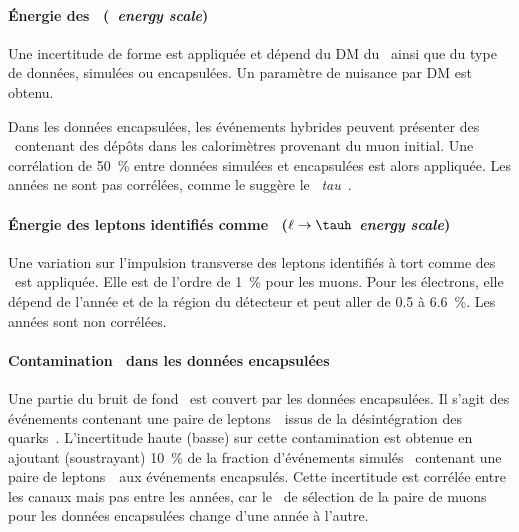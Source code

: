 \paragraph{Énergie des \tauh\ (\emph{\tauh\ energy scale})}
Une incertitude de forme est appliquée et dépend du DM du \tauh\ ainsi que du type de données, simulées ou encapsulées.
Un paramètre de nuisance par DM est obtenu.
\par
Dans les données encapsulées, les événements hybrides peuvent présenter des \tauh\ contenant des dépôts dans les calorimètres provenant du muon initial.
Une corrélation de \SI{50}{\%} entre données simulées et encapsulées est alors appliquée.
Les années ne sont pas corrélées, comme le suggère le \POG\ \emph{tau}~\cite{TauPOG}.
\paragraph{Énergie des leptons identifiés comme \tauh\ (\emph{$\ell\to\tauh$ energy scale})}
Une variation sur l'impulsion transverse des leptons identifiés à tort comme des \tauh\ est appliquée.
Elle est de l'ordre de \SI{1}{\%} pour les muons.
Pour les électrons, elle dépend de l'année et de la région du détecteur et peut aller de \num{0.5} à \SI{6.6}{\%}.
Les années sont non corrélées.
\paragraph{Contamination \ttbar\ dans les données encapsulées}
Une partie du bruit de fond \ttbar\ est couvert par les données encapsulées.
Il s'agit des événements contenant une paire de leptons~\tau\ issus de la désintégration des quarks~\quarkt.
L'incertitude haute (basse) sur cette contamination est obtenue en ajoutant (soustrayant) \SI{10}{\%} de la fraction d'événements simulés \ttbar\ contenant une paire de leptons~\tau\ aux événements encapsulés.
Cette incertitude est corrélée entre les canaux mais pas entre les années, car le \HLTpath\ de sélection de la paire de muons pour les données encapsulées change d'une année à l'autre.
